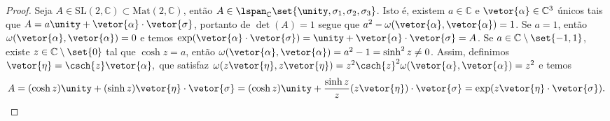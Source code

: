 \begin{proof}
    Seja \(A \in \mathrm{SL}(2,\mathbb{C}) \subset \mathrm{Mat}(2, \mathbb{C})\), então \(A \in \lspan_{\mathbb{C}}\set{\unity, \sigma_1, \sigma_2, \sigma_3}\). Isto é, existem \(a \in \mathbb{C}\) e \(\vetor{\alpha} \in \mathbb{C}^3\) únicos tais que \(A = a \unity + \vetor{\alpha}\cdot{\vetor{\sigma}}\), portanto de \(\det(A) = 1\) segue que \(a^2 - \omega(\vetor{\alpha},\vetor{\alpha})= 1\).  Se \(a = 1\), então \(\omega(\vetor{\alpha},\vetor{\alpha}) = 0\) e temos \(\exp(\vetor{\alpha}\cdot\vetor{\sigma}) = \unity + \vetor{\alpha}\cdot\vetor{\sigma} = A\). Se \(a \in \mathbb{C} \setminus\set{-1, 1}\), existe \(z\in \mathbb{C}\setminus\set{0}\) tal que \(\cosh{z} = a\), então \(\omega(\vetor{\alpha}, \vetor{\alpha}) = a^2 - 1 = \sinh^2{z} \neq 0\). Assim, definimos \(\vetor{\eta} = \csch{z} \vetor{\alpha},\) que satisfaz \(\omega(z\vetor{\eta},z\vetor{\eta}) = z^2\csch{z}^2 \omega(\vetor{\alpha}, \vetor{\alpha}) = z^2\) e temos
    \begin{equation*}
        A = (\cosh{z})\unity + (\sinh{z}) \vetor{\eta}\cdot \vetor{\sigma} = (\cosh{z})\unity + \frac{\sinh{z}}{z}(z\vetor{\eta})\cdot \vetor{\sigma} = \exp(z \vetor{\eta}\cdot \vetor{\sigma}).
    \end{equation*}
    \todo[O que acontece com \(\mathrm{SL}(2,\mathbb{C}) \ni -\unity +\sigma_1 + i \sigma_2 = \begin{smallpmatrix}
        -1 & 2\\
        0 & -1
    \end{smallpmatrix}\)?]
\end{proof}
